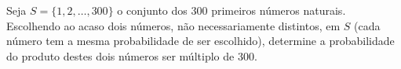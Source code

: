 Seja $S = \{1, 2, \dots, 300\}$ o conjunto dos $300$ primeiros números naturais. Escolhendo ao acaso dois números, não necessariamente distintos, em $S$ (cada número tem a mesma probabilidade de ser escolhido), determine a probabilidade do produto destes dois números ser múltiplo de $300$.
